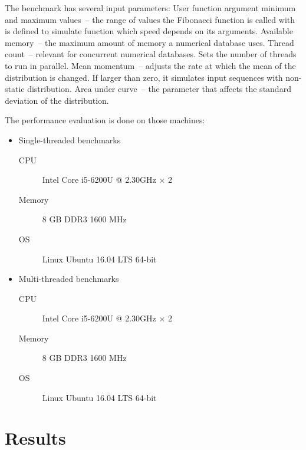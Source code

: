 The benchmark has several input parameters:
User function argument minimum and maximum values~-- the range of values the Fibonacci function is called with is defined to simulate function which speed depends on its arguments.
Available memory~-- the maximum amount of memory a numerical database uses.
Thread count~-- relevant for concurrent numerical databases. Sets the number of  threads to run in parallel.
Mean momentum~-- adjusts the rate at which the mean of the distribution is changed. If larger than zero, it simulates input sequences with non-static distribution.
Area under curve~-- the parameter that affects the standard deviation of the distribution.

The performance evaluation is done on those machines:
\begin{itemize}
\item Single-threaded benchmarks
\begin{description}
\item [CPU] Intel\textregistered{} Core\texttrademark{} i5-6200U @ 2.30GHz $ \times $ 2
\item [Memory] 8 GB DDR3 1600 MHz
\item [OS] Linux\textregistered{} Ubuntu\textregistered{} 16.04 LTS 64-bit
\end{description}
\item Multi-threaded benchmarks
\begin{description}
\item [CPU] Intel\textregistered{} Core\texttrademark{} i5-6200U @ 2.30GHz $ \times $ 2
\item [Memory] 8 GB DDR3 1600 MHz
\item [OS] Linux\textregistered{} Ubuntu\textregistered{} 16.04 LTS 64-bit
\end{description}
\end{itemize}

\section{Results}
